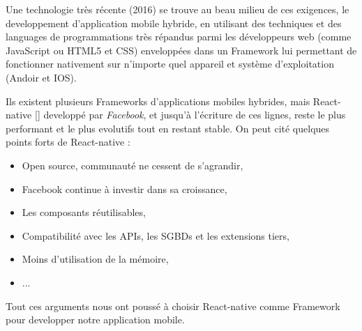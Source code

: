    Une technologie très récente (2016) se trouve au beau milieu de ces exigences, le developpement d'application mobile hybride, en utilisant des techniques et des languages de programmations très répandus parmi les développeurs web (comme JavaScript ou HTML5 et CSS) enveloppées dans un Framework lui permettant de fonctionner nativement sur n'importe quel appareil et système d'exploitation (Andoir et IOS).

    Ils existent plusieurs Frameworks d'applications mobiles hybrides, mais React-native \autoref{} developpé par \emph{Facebook}, et jusqu'à l'écriture de ces lignes, reste le plus performant et le plus evolutifs tout en restant stable. On peut cité quelques points forts de React-native : 
        \begin{itemize}
            \item Open source, communauté ne cessent de s'agrandir,
            \item Facebook continue à investir dans sa croissance,
            \item Les composants réutilisables,
            \item Compatibilité avec les APIs, les SGBDs et les extensions tiers,
            \item Moins d'utilisation de la mémoire,
            \item ...
        \end{itemize}
    Tout ces arguments nous ont poussé à choisir React-native comme Framework pour developper notre application mobile. 

